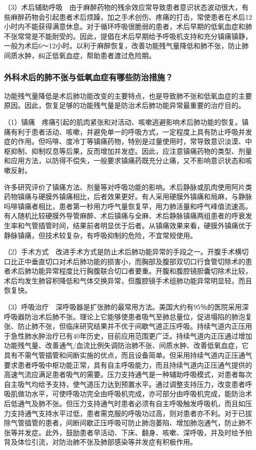 （3）术后辅助呼吸　由于麻醉药物的残余效应常导致患者意识状态波动很大，有些麻醉药物会引起患者术后烦躁，加之手术创伤、疼痛的打击，常使患者在术后12小时内不能获得满意休息。对于循环呼吸很脆弱的患者，术后早期的低氧血症和肺不张常常是不能耐受的。因此，提倡在术后早期给予呼吸机支持和充分镇痛镇静，一般为术后6～12小时。以利于麻醉恢复，改善功能残气量降低和肺不张，防止肺间质水肿，纠正低氧血症，帮助患者渡过危险期。

\subsubsection{外科术后的肺不张与低氧血症有哪些防治措施？}

功能残气量降低是术后肺功能改变的主要特点，也是导致肺不张和低氧血症的主要原因。因此，恢复足够的功能残气量是防治术后肺功能异常最重要的治疗目的。

（1）镇痛　疼痛引起的肌肉紧张和对活动、咳嗽逃避影响术后肺功能的恢复。镇痛有利于患者活动、咳嗽，并避免单一的呼吸方式，一定程度上具有防止呼吸并发症的作用。但吗啡、度冷丁等镇痛药物，特别是过量使用时，常导致意识淡漠、中枢抑制、抑制叹息等后果，反而增加并发症。因此，应注意镇痛药物的类型、剂量和应用方法，以防得不偿失，一般要求镇痛药既充分止痛，又不影响意识状态和咳嗽反射。

许多研究评价了镇痛方法、剂量等对呼吸功能的影响。术后静脉或肌肉使用阿片类药物镇痛与硬膜外镇痛相比，后者效果更好。有人采用硬膜外镇痛和局麻，与静脉吗啡镇痛者相比，患者第一秒用力呼气量恢复早，用力肺活量和呼气峰值流速高。有人随机比较硬膜外导管麻醉、术后镇痛与全麻、术后静脉镇痛两组患者的呼衰发生率和气管插管时间，结果前者明显优于后者。从镇痛效果来看，硬膜外镇痛优于静脉镇痛，但技术较复杂，有呼吸抑制的危险，不宜常规使用。

（2）手术方式　改进手术方式是防止术后肺功能异常的手段之一。开腹手术横切口比正中垂直切口对术后肺功能的损害小，而胸部及腹部双切口行食管切除术的患者术后肺功能异常程度比行胸腹联合切口者要重。开腹和腹腔镜胆囊切除术比较，术后均发生肺容积降低和气体交换异常，但腹腔镜手术组肺功能异常明显轻，而且恢复快。

（3）呼吸治疗　深呼吸器是扩张肺的最常用方法。美国大约有95％的医院采用深呼吸器防治术后肺不张。理论上它能够使患者吸气至肺总量位，促进塌陷的肺泡复张、防止肺不张，但临床研究结果并不优于间歇气道正压呼吸。持续气道内正压用于急性肺水肿治疗已有40年历史，目前应用范围更广泛。持续气道内正压通过增加功能残气量、改善通气/血流比例失调防治肺不张、间质水肿、改善低氧血症，它具有不需气管插管和间断实施的优点，而且设备简单。但采用持续气道内正压通气要求患者呼吸中枢功能正常，具有自主呼吸能力，而且持续气道内正压通气提供的高速气流应满足患者吸气的需要。压力支持通气是一种辅助呼吸模式，对患者每次自主吸气均给予支持，使气道压力达到预置水平。通过调整支持压力，改变患者呼吸肌做功水平，可使呼吸功完全由呼吸机完成，亦可部分由呼吸机完成，能防治术后低通气及肺不张。但压力支持通气时患者必须有自主呼吸触发呼吸机，而且如压力支持通气支持水平过低，患者需克服的呼吸功过高，则对患者亦不利。对于已拔除气管插管的患者，间断间歇正压呼吸可防止肺泡萎陷、增加肺泡通气，防止肺不张等并发症。此外，鼓励患者早活动、下床、翻身、咳嗽、深呼吸，并及时给予拍背及体位引流，对防治肺不张及肺部感染等并发症有积极作用。

